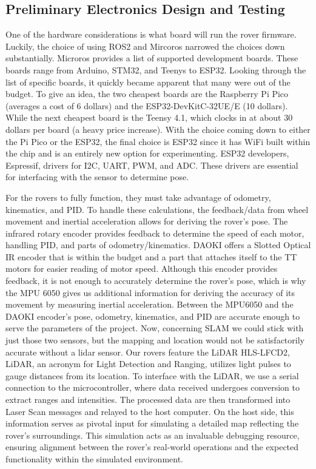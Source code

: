 \documentclass[conference]{IEEEtran}
\begin{document}
\subsection{Preliminary Electronics Design and Testing}
One of the hardware considerations is what board will run the rover firmware. Luckily, the choice of using ROS2 and Mircoros narrowed the choices down substantially. Microros provides a list of supported development boards. These boards range from Arduino, STM32, and Teenys to ESP32. Looking through the list of specific boards, it quickly became apparent that many were out of the budget. To give an idea, the two cheapest boards are the Raspberry Pi Pico (averages a cost of 6 dollars) and the ESP32-DevKitC-32UE/E (10 dollars). While the next cheapest board is the Teensy 4.1, which clocks in at about 30 dollars per board (a heavy price increase). With the choice coming down to either the Pi Pico or the ESP32, the final choice is ESP32 since it has WiFi built within the chip and is an entirely new option for experimenting. ESP32 developers, Espressif, drivers for I2C, UART, PWM, and ADC. These drivers are essential for interfacing with the sensor to determine pose.

For the rovers to fully function, they must take advantage of odometry, kinematics, and PID. To handle these calculations, the feedback/data from wheel movement and inertial acceleration allows for deriving the rover's pose. The infrared rotary encoder provides feedback to determine the speed of each motor, handling PID, and parts of odometry/kinematics. DAOKI offers a Slotted Optical IR encoder that is within the budget and a part that attaches itself to the TT motors for easier reading of motor speed. Although this encoder provides feedback, it is not enough to accurately determine the rover's pose, which is why the MPU 6050 gives us additional information for deriving the accuracy of its movement by measuring inertial acceleration. Between the MPU6050 and the DAOKI encoder's pose, odometry, kinematics, and PID are accurate enough to serve the parameters of the project. Now, concerning SLAM we could stick with just those two sensors, but the mapping and location would not be satisfactorily accurate without a lidar sensor. Our rovers feature the LiDAR HLS-LFCD2, LiDAR, an acronym for Light Detection and Ranging, utilizes light pulses to gauge distances from its location. To interface with the LiDAR, we use a serial connection to the microcontroller, where data received undergoes conversion to extract ranges and intensities. The processed data are then transformed into Laser Scan messages and relayed to the host computer. On the host side, this information serves as pivotal input for simulating a detailed map reflecting the rover's surroundings. This simulation acts as an invaluable debugging resource, ensuring alignment between the rover's real-world operations and the expected functionality within the simulated environment.
\end{document}
